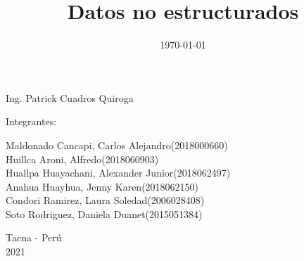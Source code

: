 \documentclass[twoside,twocolumn]{article}
\begin{document}
\begin{titlepage}
\begin{center}
\vspace*{0.1in}
\begin{large}
 Ing. Patrick Cuadros Quiroga\\
\end{large}

\vspace*{0.2in}
\vspace*{0.1in}
\begin{large}

Integrantes: \\
\begin{flushleft}
Maldonado Cancapi, Carlos Alejandro\hfill(2018000660) \\
Huillca Aroni, Alfredo\hfill(2018060903)\\
Huallpa Huayachani, Alexander Junior\hfill(2018062497)\\
Anahua Huayhua, Jenny Karen\hfill(2018062150)\\
Condori Ramirez, Laura Soledad\hfill(2006028408)\\
Soto Rodriguez, Daniela Duanet\hfill(2015051384)\\

\end{flushleft}
\end{large}

\vspace*{0.1in}
\begin{large}
Tacna - Perú\\
2021
\end{large}
\end{center}
\end{titlepage}

\setlength{\droptitle}{-4\baselineskip} %

\pretitle{\begin{center}\Huge\bfseries} %
\posttitle{\end{center}} %
\title{Datos no estructurados} %

\date{\today} %
\renewcommand{\maketitlehookd}{%

}




\maketitle
\end{document}
